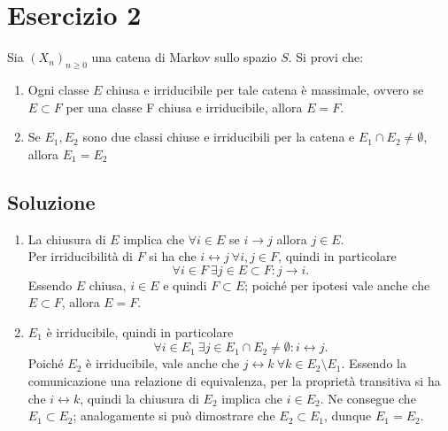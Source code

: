 \documentclass[
	12pt, %
]{fphw}
\begin{document}
\newpage
\section*{Esercizio 2}
\begin{problem}
	\smallskip
	Sia $(X_n)_{n \ge 0}$ una catena di Markov sullo spazio $S$. Si provi che:
	\begin{enumerate}
		\item Ogni classe $E$ chiusa e irriducibile per tale catena è massimale, 
		ovvero se $E \subset F$ per una classe F chiusa e irriducibile, allora $E = F$.
		\item Se $E_1, E_2$ sono due classi chiuse e irriducibili per la catena e
		$E_1 \cap E_2 \ne \emptyset$, allora $E_1 = E_2$
	\end{enumerate}
	\smallskip
\end{problem}
\medskip
\subsection*{Soluzione}
	\begin{enumerate}
		\item La chiusura di $E$ implica che $\forall i \in E$ se $i \to j$ allora $j \in E$.\\
		Per irriducibilità di $F$ si ha che $i \leftrightarrow j ~ \forall i,j \in F$, quindi in particolare
		\begin{equation*}
			\forall i \in F ~ \exists j \in E \subset F : j \to i.
		\end{equation*}
		Essendo $E$ chiusa, $i \in E$ e quindi $F \subset E$;
		poiché per ipotesi vale anche che $E \subset F$, allora $E = F$.
		\item $E_1$ è irriducibile, quindi in particolare
		\begin{equation*}
			\forall i \in E_1 ~ \exists j \in E_1 \cap E_2 \ne \emptyset : i \leftrightarrow j.
		\end{equation*}
		Poiché $E_2$ è irriducibile, vale anche che $j \leftrightarrow k ~ \forall k \in E_2 \setminus E_1$.
		Essendo la comunicazione una relazione di equivalenza, per la proprietà transitiva si ha che $i \leftrightarrow k$, quindi la chiusura di $E_2$ implica che $i \in E_2$.
		Ne consegue che $E_1 \subset E_2$; analogamente si può dimostrare che $E_2 \subset E_1$, dunque $E_1 = E_2$.
	\end{enumerate}

\end{document}
